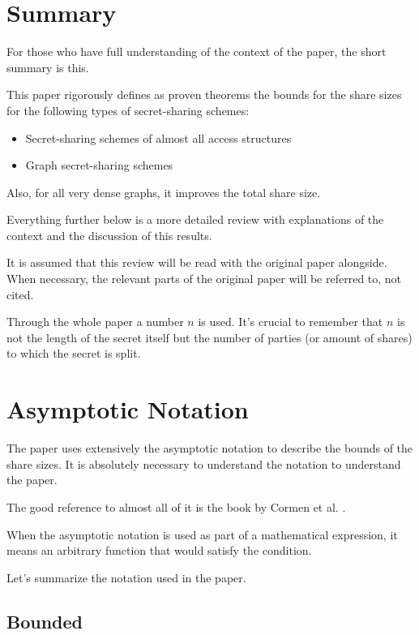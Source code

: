 \section{Summary}

For those who have full understanding of the context of the paper, the short summary is this.

This paper rigorously defines as proven theorems the bounds for the share sizes for the following types of secret-sharing schemes:

\begin{itemize}
    \item Secret-sharing schemes of almost all access structures
    \item Graph secret-sharing schemes
\end{itemize}

Also, for all very dense graphs, it improves the total share size.

Everything further below is a more detailed review with explanations of the context and the discussion of this results.

It is assumed that this review will be read with the original paper alongside.
When necessary, the relevant parts of the original paper will be referred to, not cited.

Through the whole paper a number $n$ is used.
It's crucial to remember that $n$ is not the length of the secret itself but the number of parties (or amount of shares) to which the secret is split.

\section{Asymptotic Notation}

The paper uses extensively the asymptotic notation to describe the bounds of the share sizes.
It is absolutely necessary to understand the notation to understand the paper.

The good reference to almost all of it is the book by Cormen et al. \cite{cormen2009introduction}.

When the asymptotic notation is used as part of a mathematical expression, it means an arbitrary function that would satisfy the condition.

Let's summarize the notation used in the paper.

\subsection{Bounded}


